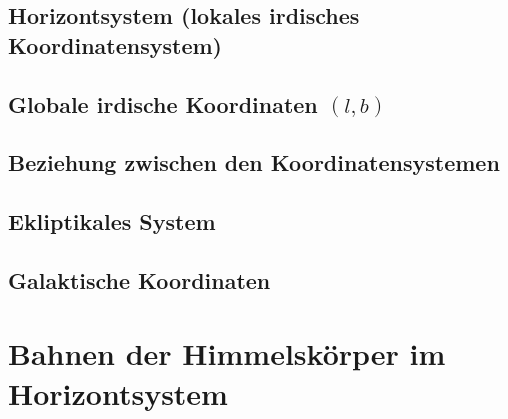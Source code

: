 \subsection[Horizontsystem]{Horizontsystem (lokales irdisches Koordinatensystem)}
\subsection[Globale irdische Koordinaten]{Globale irdische Koordinaten $(l, b)$}
\subsection{Beziehung zwischen den Koordinatensystemen}
\subsection{Ekliptikales System}
\subsection{Galaktische Koordinaten}

\section{Bahnen der Himmelskörper im Horizontsystem}
